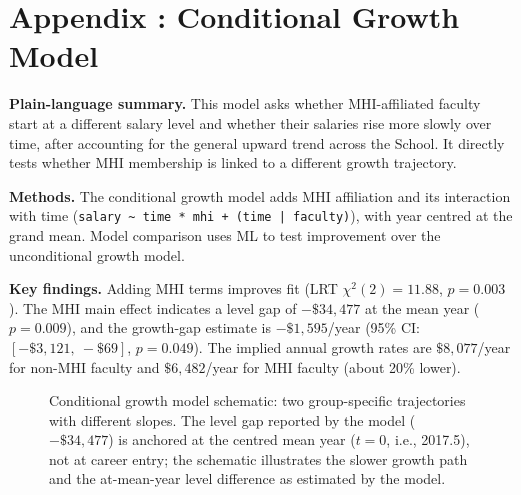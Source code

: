 \documentclass{article}
\begin{document}
\clearpage
{}
\section*{Appendix \thesection: Conditional Growth Model}
\label{app:conditional_growth}

\textbf{Plain-language summary.} This model asks whether MHI-affiliated faculty start at a different salary level and whether their salaries rise more slowly over time, after accounting for the general upward trend across the School. It directly tests whether MHI membership is linked to a different growth trajectory.

\textbf{Methods.} The conditional growth model adds MHI affiliation and its interaction with time (\texttt{salary \textasciitilde{} time * mhi + (time | faculty)}), with year centred at the grand mean. Model comparison uses ML to test improvement over the unconditional growth model.

\textbf{Key findings.} Adding MHI terms improves fit (LRT \(\chi^2(2) = 11.88\), \(p = 0.003\)). The MHI main effect indicates a level gap of \(-\$34{,}477\) at the mean year (\(p = 0.009\)), and the growth-gap estimate is \(-\$1{,}595\)/year (95\% CI: \([-\$3{,}121,\ -\$69]\), \(p = 0.049\)). The implied annual growth rates are \(\$8{,}077\)/year for non-MHI faculty and \(\$6{,}482\)/year for MHI faculty (about 20\% lower).

\begin{figure}[h]
    \centering
    \caption{Conditional growth model schematic: two group-specific trajectories with different slopes. The level gap reported by the model ($-\$34{,}477$) is anchored at the centred mean year ($t=0$, i.e., 2017.5), not at career entry; the schematic illustrates the slower growth path and the at-mean-year level difference as estimated by the model.}
\end{figure}
\end{document}
